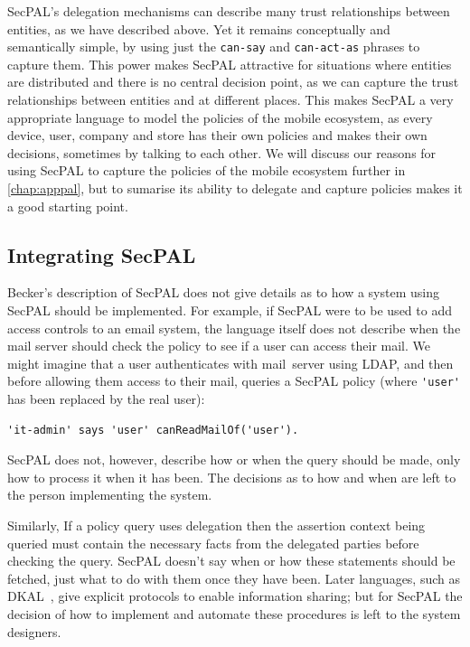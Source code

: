 \documentclass[thesis.tex]{subfiles}
\begin{document}
SecPAL's delegation mechanisms can describe many trust relationships
between entities, as we have described above. Yet it remains
conceptually and semantically simple, by using just the \texttt{can-say} and \texttt{can-act-as} phrases to capture them. This power makes SecPAL
attractive for situations where entities are distributed and there is
no central decision point, as we can capture the trust relationships
between entities and at different places. This makes SecPAL a very
appropriate language to model the policies of the mobile ecosystem, as
every device, user, company and store has their own policies and makes
their own decisions, sometimes by talking to each other. We will
discuss our reasons for using SecPAL to capture the policies of the
mobile ecosystem further in \autoref{chap:apppal}, but to sumarise its
ability to delegate and capture policies makes it a good starting
point.

\subsection{Integrating SecPAL}

Becker's description of SecPAL does not give details as to how a system using
SecPAL should be implemented. For example, if SecPAL were to be used to add
access controls to an email system, the language itself does not describe when
the mail server should check the policy to see if a user can access their mail.
We might imagine that a user authenticates with mail~server using LDAP, and then
before allowing them access to their mail, queries a SecPAL policy (where
\lstinline!'user'! has been replaced by the real user):
\begin{lstlisting}
'it-admin' says 'user' canReadMailOf('user').
\end{lstlisting}
SecPAL does not, however, describe how or when the query should be made, only
how to process it when it has been. The decisions as to how and when are left to
the person implementing the system.

Similarly, If a policy query uses delegation then the assertion context being queried must
contain the necessary facts from the delegated parties before checking the
query. SecPAL doesn't say when or how these statements should be fetched, just
what to do with them once they have been. Later languages, such as
DKAL~\cite{gurevich_dkal:_2008}, give explicit protocols to enable information
sharing; but for SecPAL the decision of how to implement and automate these
procedures is left to the system designers.
\end{document}
